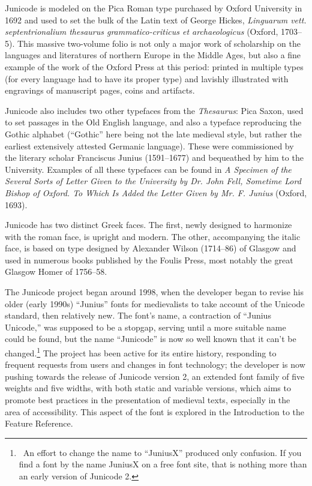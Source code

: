 \documentclass[12pt,letterpaper,openany]{book}
\newcounter{Feature}
\begin{document}
{\large%
\noindent Junicode is modeled on the Pica Roman type
purchased by Oxford University in 1692 and
used to set the bulk of the Latin text of George Hickes,
{\itshape Linguarum vett. septentrionalium thesaurus
grammatico-criticus et archaeologicus} (Oxford, 1703–5). This massive two-volume folio
is not only a major work of scholarship on the languages and literatures
of northern Europe in the Middle Ages, but also a fine
example of the work of the Oxford Press at this
period: printed in multiple types (for every language had to
have its proper type) and lavishly
illustrated with engravings of manuscript pages, coins and
artifacts.

Junicode also includes two other typefaces from the \textit{Thesaurus}:
Pica Saxon, used to set passages in the Old English language,
and also a typeface reproducing the Gothic alphabet (“Gothic” here
being not the late medieval style, but rather
the earliest extensively attested Germanic language).
These were commissioned by the literary scholar
Francis\-cus Junius (1591–1677) and bequeathed by him to
the University. Examples of all these typefaces can be found
in {\itshape A Specimen of the
Several Sorts of Letter Given to the University by Dr. John Fell,
Sometime Lord Bishop of Oxford. To Which Is Added the Letter Given by
Mr. F. Junius} (Oxford, 1693).

Junicode has two distinct Greek faces. The first, newly designed to harmonize with the roman face, is
up\-right and modern. The other, accompanying the italic face, is based on type designed by Alexander
Wilson (1714–86) of Glasgow and used in numerous books published by
the Foulis Press, most notably the great Glasgow Homer of 1756–58.

The Junicode project began around 1998, when the developer began to revise his
older (early 1990s) “Junius” fonts for medievalists to take account of the Unicode
standard, then relatively new. The font’s name, a contraction of
“Junius Unicode,” was supposed to be a stopgap, serving until a more suitable name
could be found, but the name “Junicode” is now so well known that it can’t be
changed.\footnote{\ An effort to change the name to “JuniusX” produced
only confusion. If you find a font by the name JuniusX on a free font site,
that is nothing more than an early version of Junicode 2.}
The project has been active for its entire history, responding to frequent
requests from users and changes in font technology; the developer is now pushing
towards the release of Junicode version 2, an extended font family of five weights
and five widths, with both static and variable versions, which aims to
promote best practices in the presentation of medieval texts, especially in
the area of accessibility. This aspect of the font is explored in the
Introduction to the Feature Reference.

}
\end{document}
